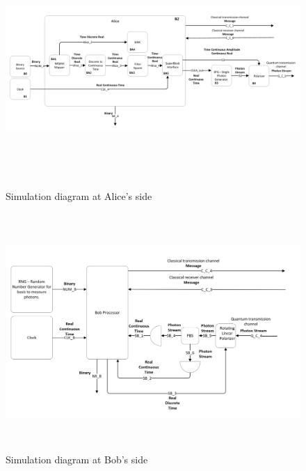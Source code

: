 \begin{figure}[h]
	\centering
	\includegraphics[width=1.0\textwidth, height=9cm]{./sdf/bb84_with_discrete_variables/figures/alice_simulation.png}
	\caption{Simulation diagram at Alice's side}\label{alicesimulation}
\end{figure}

\begin{figure}[h]
	\centering
	\includegraphics[width=1.0\textwidth, height=9cm]{./sdf/bb84_with_discrete_variables/figures/bob_simulation.png}
	\caption{Simulation diagram at Bob's side}\label{bobsimulation}
\end{figure}


